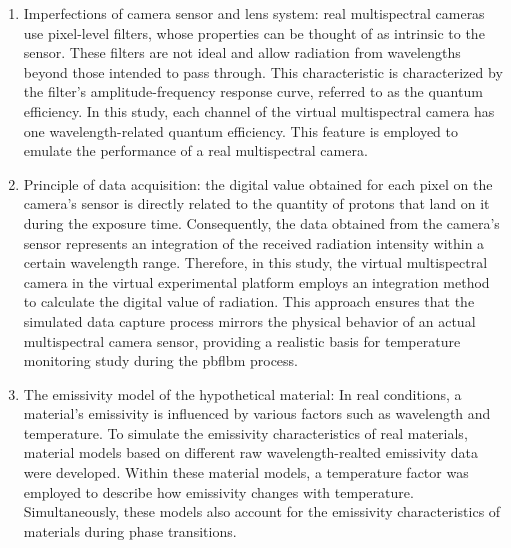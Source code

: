 \begin{enumerate}
    \item Imperfections of camera sensor and lens system: real multispectral 
    cameras use pixel-level filters, whose properties can be thought of as intrinsic to the 
    sensor. These filters are not ideal and allow radiation from wavelengths beyond those 
    intended to pass through. This characteristic is characterized by the filter's amplitude-frequency 
    response curve, referred to as the quantum efficiency. In this study, each channel of the 
    virtual multispectral camera has one wavelength-related quantum efficiency.
    This feature is employed to emulate the performance of a real multispectral camera.
    

    \item Principle of data acquisition: the digital value obtained for each pixel on the 
    camera's sensor is directly related to the quantity of protons that land on it during 
    the exposure time\cite{JamesC.Mullikin.1994}. Consequently, the data obtained from the 
    camera's sensor represents an integration of the received radiation intensity 
    within a certain wavelength range. Therefore, in this study, the virtual 
    multispectral camera in the virtual experimental platform employs an integration 
    method to calculate the digital value of radiation. This approach ensures that the 
    simulated data capture process mirrors the physical behavior of an actual multispectral 
    camera sensor, providing a realistic basis for temperature monitoring study during 
    the \gls{pbflbm} process.

    \item The emissivity model of the hypothetical material: In real conditions, a material's 
    emissivity is influenced by various factors such as wavelength and temperature. To simulate the 
    emissivity characteristics of real materials, material models based on different raw
    wavelength-realted emissivity data were developed. Within these material models, a temperature factor was 
    employed to describe how emissivity changes with temperature. Simultaneously, these 
    models also account for the emissivity characteristics of materials during phase transitions.

\end{enumerate}


